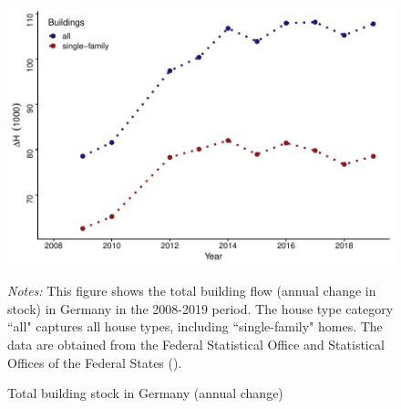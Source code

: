\documentclass[
  12pt,
]{article}
\begin{document}
\begin{figure}[H]
\centering

\begin{center}\includegraphics{output/figs/quantity-growth-1} \end{center}

\caption{Total building stock in Germany (annual change)}
\medskip
\begin{minipage}{0.9\textwidth}
\footnotesize
\textit{Notes:} This figure shows the total building flow (annual change in stock) in Germany in the 2008-2019 period. The house type category ``all" captures all house types, including ``single-family" homes. The data are obtained from the Federal Statistical Office and Statistical Offices of the Federal States (). 
\end{minipage}
\end{figure}
\end{document}
